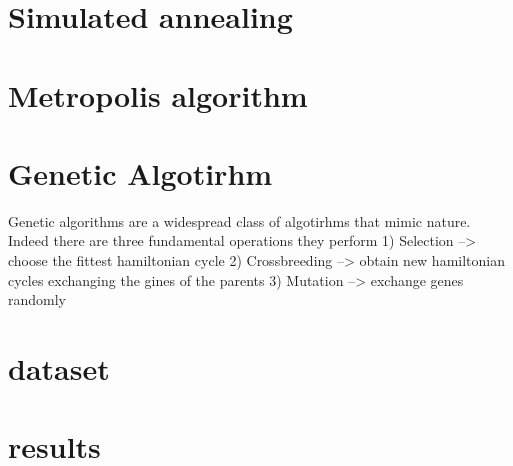 \documentclass{article}
\begin{document}
\section{Simulated annealing}

\section{Metropolis algorithm}

\section{Genetic Algotirhm}
Genetic algorithms are a widespread class of algotirhms that mimic nature. Indeed there are three fundamental operations they perform
1) Selection --> choose the fittest hamiltonian cycle
2) Crossbreeding --> obtain new hamiltonian cycles exchanging the gines of the parents
3) Mutation --> exchange genes randomly
\section{dataset}

\section{results}
\end{document}
